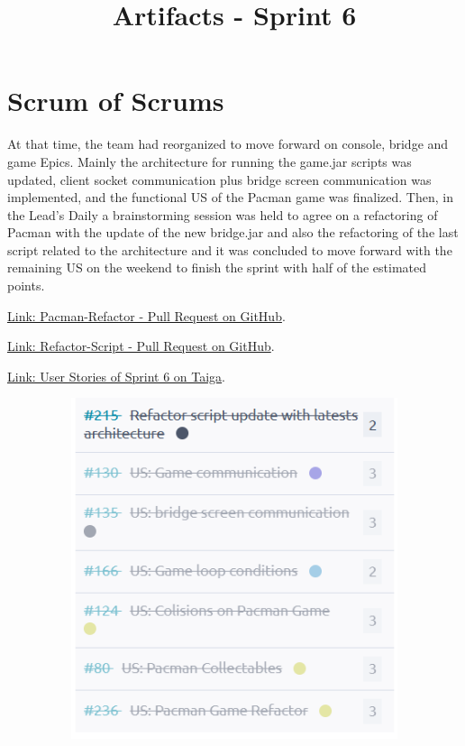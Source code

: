 \documentclass{article}
\title{Artifacts - Sprint 6}
\date{}
\begin{document}
\maketitle

\hypertarget{sos-s3} {
\section{Scrum of Scrums}\label{Scrum of Scrums} 
At that time, the team had reorganized to move forward on console, bridge and game Epics.
Mainly the architecture for running the game.jar scripts was updated, client socket communication plus bridge screen communication was implemented, and the functional US of the Pacman game was finalized. Then, in the Lead's Daily a brainstorming session was held to agree on a refactoring of Pacman with the update of the new bridge.jar and also the refactoring of the last script related to the architecture and it was concluded to move forward with the remaining US on the weekend to finish the sprint with half of the estimated points.
}

\href{https://github.com/Pending-Name-21/pac-man/pull/10}{Link: Pacman-Refactor - Pull Request on GitHub}.

\href{https://github.com/Pending-Name-21/miscellany/pull/17}{Link: Refactor-Script - Pull Request on GitHub}.

\href{https://tree.taiga.io/project/joseluis-teran-coffeetime/taskboard/sprint-6-3003}{Link: User Stories of Sprint 6 on Taiga}.

\begin{figure}
\centering
\includegraphics[width=16cm, height=10cm]{./assets/US-Sprint6.png}
\end{figure}
\end{document}
